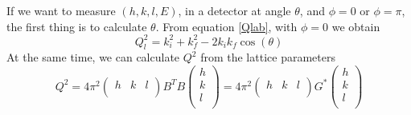 \documentclass[prb]{revtex4}%
\begin{document}
If we want to measure $(h, k, l, E)$, in a detector at angle $\theta$, and $\phi=0$ or $\phi=\pi$, the first thing is
to calculate $\theta$. From equation \ref{Qlab}, with $\phi=0$ we obtain
\begin{equation}
    Q^2_l=k^2_i+k^2_f-2 k_i k_f \cos(\theta)
\end{equation}
At the same time, we can calculate $Q^2$ from the lattice parameters
\begin{equation}
    Q^2 = 4\pi^2 \left(
            \begin{array}{ccc}
              h & k & l \\
            \end{array}
          \right)B^T B \left(
                         \begin{array}{c}
                           h \\
                           k \\
                           l \\
                         \end{array}
                       \right) = 4\pi^2 \left(
            \begin{array}{ccc}
              h & k & l \\
            \end{array}
          \right) G^* \left(
                         \begin{array}{c}
                           h \\
                           k \\
                           l \\
                         \end{array}
                       \right)
\end{equation}
\end{document}
